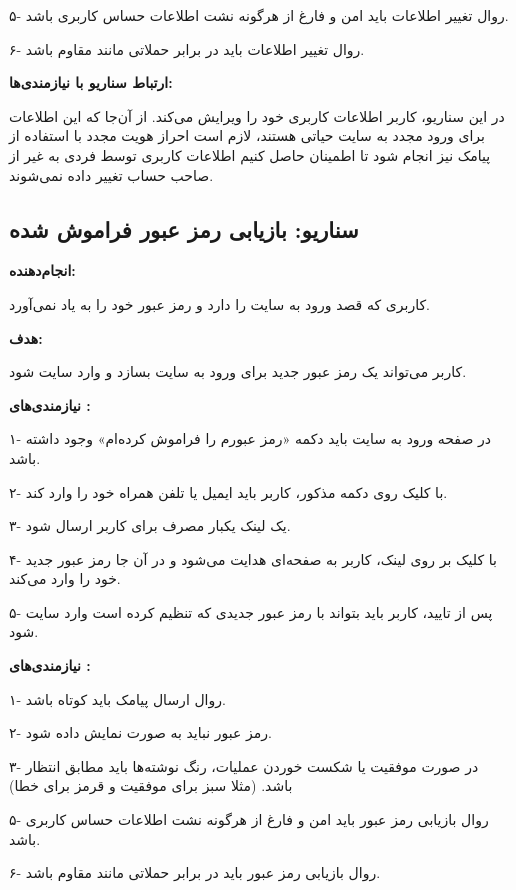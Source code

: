 \documentclass[]{article}
\begin{document}
	۵- روال تغییر اطلاعات باید امن و فارغ از هرگونه نشت اطلاعات حساس کاربری باشد.
	
	۶- روال تغییر اطلاعات باید در برابر حملاتی مانند  مقاوم باشد.
	
	\textbf{ارتباط سناریو با نیازمندی‌ها:}
	
	در این سناریو،‌ کاربر اطلاعات کاربری خود را ویرایش می‌کند. از آن‌جا که این اطلاعات برای ورود مجدد به سایت حیاتی هستند،‌ لازم است احراز هویت مجدد با استفاده از پیامک نیز انجام شود تا اطمینان حاصل کنیم اطلاعات کاربری توسط فردی به غیر از صاحب حساب تغییر داده نمی‌شوند.
	
	
	\subsection{\LARGE{سناریو: بازیابی رمز عبور فراموش شده}}
	
	\textbf{انجام‌دهنده:}
	
	کاربری که قصد ورود به سایت را دارد و رمز عبور خود را به یاد نمی‌آورد.
	
	\textbf{هدف:}
	
	کاربر می‌تواند یک رمز عبور جدید برای ورود به سایت بسازد و وارد سایت شود.
	
	\textbf{نیازمندی‌های :} 
	
	۱- در صفحه ورود به سایت باید دکمه «رمز عبورم را فراموش کرده‌ام» وجود داشته باشد.
	
	۲- با کلیک روی دکمه مذکور، کاربر باید ایمیل یا تلفن همراه خود را وارد کند.
	
	۳- یک لینک یکبار مصرف برای کاربر ارسال شود.
	
	۴- با کلیک بر روی لینک، کاربر به صفحه‌ای هدایت می‌شود و در آن جا رمز عبور جدید خود را وارد می‌کند.
	
	۵- پس از تایید، کاربر باید بتواند با رمز عبور جدیدی که تنظیم کرده است وارد سایت شود.
	
	\textbf{نیازمندی‌های :}
	
	۱- روال ارسال پیامک باید کوتاه باشد.
	
	۲- رمز عبور نباید به صورت  نمایش داده شود.
	
	۳- در صورت موفقیت یا شکست خوردن عملیات، رنگ نوشته‌ها باید مطابق انتظار باشد. (مثلا سبز برای موفقیت و قرمز برای خطا)
	
	۵- روال بازیابی رمز عبور باید امن و فارغ از هرگونه نشت اطلاعات حساس کاربری باشد.
	
	۶- روال بازیابی رمز عبور باید در برابر حملاتی مانند  مقاوم باشد.
	
\end{document}
